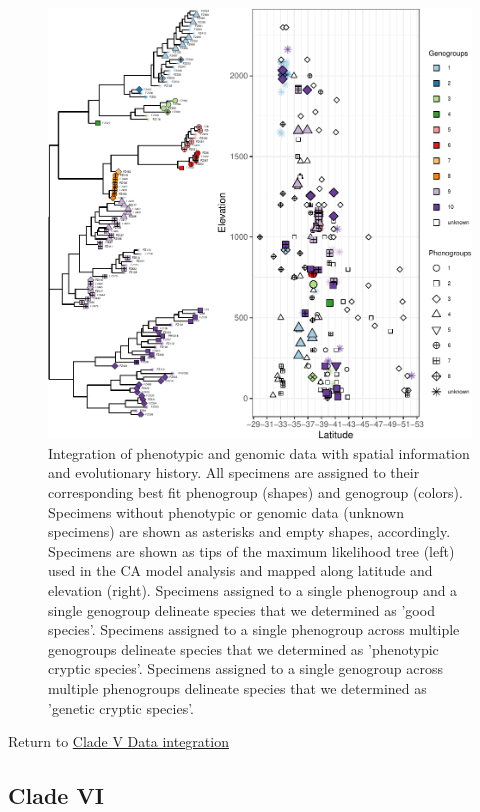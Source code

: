 \documentclass[
  11pt,
]{article}
\begin{document}
\begin{figure}
\includegraphics{Supplementary_Material_files/figure-latex/cladeVfinalDelimitation2-1} \caption{Integration of phenotypic and genomic data with spatial information and evolutionary history. All specimens are assigned to their corresponding best fit phenogroup (shapes) and genogroup (colors). Specimens without phenotypic or genomic data (unknown specimens) are shown as asterisks and empty shapes, accordingly. Specimens are shown as tips of the maximum likelihood tree (left) used in the CA model analysis and mapped along latitude and elevation (right). Specimens assigned to a single phenogroup and a single genogroup delineate species that we determined as 'good species'. Specimens assigned to a single phenogroup across multiple genogroups delineate species that we determined as 'phenotypic cryptic species'. Specimens assigned to a single genogroup across multiple phenogroups delineate species that we determined as 'genetic cryptic species'.}\label{fig:cladeVfinalDelimitation2}
\end{figure}

Return to \protect\hyperlink{data-integration-5}{Clade V Data integration}
\pagebreak

\hypertarget{clade-vi-2}{%
\subsection{Clade VI}\label{clade-vi-2}}
\end{document}
